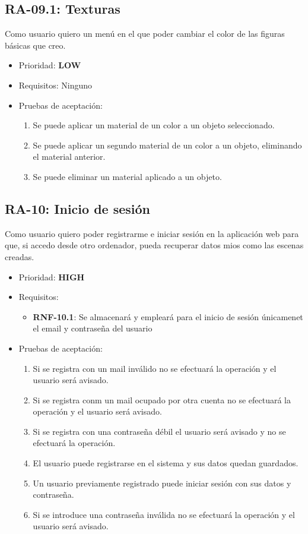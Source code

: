 \subsection{RA-09.1: Texturas}
Como usuario quiero un menú en el que poder cambiar el color de las figuras básicas que creo.

\begin{itemize}
    \item Prioridad: \textbf{LOW}
    \item Requisitos: Ninguno
    \item Pruebas de aceptación:
	\begin{enumerate}
		\item Se puede aplicar un material de un color a un objeto seleccionado.
		\item Se puede aplicar un segundo material de un color a un objeto, eliminando el material anterior.
		\item Se puede eliminar un material aplicado a un objeto.
	\end{enumerate}
\end{itemize}

\subsection{RA-10: Inicio de sesión}
Como usuario quiero poder registrarme e iniciar sesión en la aplicación web para que, si accedo desde otro ordenador, pueda recuperar datos mios como las escenas creadas.

\begin{itemize}
    \item Prioridad: \textbf{HIGH}
    \item Requisitos:
        \begin{itemize}
            \item \textbf{RNF-10.1}: Se almacenará y empleará para el inicio de sesión únicamenet el email y contraseña del usuario
        \end{itemize}
	\item Pruebas de aceptación:
	\begin{enumerate}
		\item Si se registra con un mail inválido no se efectuará la operación y el usuario será avisado.
		\item Si se registra conm un mail ocupado por otra cuenta no se efectuará la operación y el usuario será avisado.
		\item Si se registra con una contraseña débil el usuario será avisado y no se efectuará la operación.
		\item El usuario puede registrarse en el sistema y sus datos quedan guardados.
		\item Un usuario previamente registrado puede iniciar sesión con sus datos y contraseña.
		\item Si se introduce una contraseña inválida no se efectuará la operación y el usuario será avisado.
	\end{enumerate}
\end{itemize}

